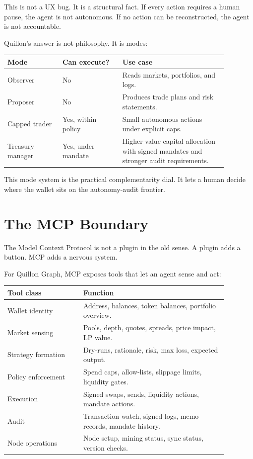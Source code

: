 \documentclass[11pt,a4paper]{article}
\begin{document}
This is not a UX bug. It is a structural fact. If every action requires a human pause, the agent is not autonomous. If no action can be reconstructed, the agent is not accountable.

Quillon's answer is not philosophy. It is modes:

\begin{longtable}{p{0.22\linewidth}p{0.24\linewidth}p{0.42\linewidth}}
\toprule
\textbf{Mode} & \textbf{Can execute?} & \textbf{Use case} \\
\midrule
Observer & No & Reads markets, portfolios, and logs. \\
Proposer & No & Produces trade plans and risk statements. \\
Capped trader & Yes, within policy & Small autonomous actions under explicit caps. \\
Treasury manager & Yes, under mandate & Higher-value capital allocation with signed mandates and stronger audit requirements. \\
\bottomrule
\end{longtable}

This mode system is the practical complementarity dial. It lets a human decide where the wallet sits on the autonomy-audit frontier.

\section{The MCP Boundary}

The Model Context Protocol is not a plugin in the old sense. A plugin adds a button. MCP adds a nervous system.

For Quillon Graph, MCP exposes tools that let an agent sense and act:

\begin{longtable}{p{0.3\linewidth}p{0.58\linewidth}}
\toprule
\textbf{Tool class} & \textbf{Function} \\
\midrule
Wallet identity & Address, balances, token balances, portfolio overview. \\
Market sensing & Pools, depth, quotes, spreads, price impact, LP value. \\
Strategy formation & Dry-runs, rationale, risk, max loss, expected output. \\
Policy enforcement & Spend caps, allow-lists, slippage limits, liquidity gates. \\
Execution & Signed swaps, sends, liquidity actions, mandate actions. \\
Audit & Transaction watch, signed logs, memo records, mandate history. \\
Node operations & Node setup, mining status, sync status, version checks. \\
\bottomrule
\end{longtable}
\end{document}
